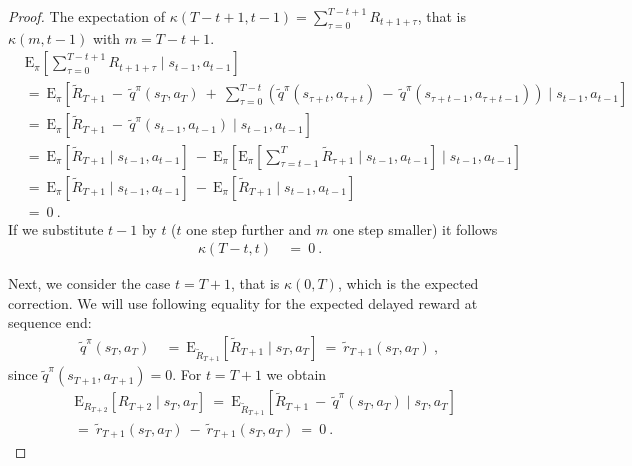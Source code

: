 \documentclass{article}
\newcommand\EXP{\mathbf{\mathrm{E}}}
\begin{document}
\begin{appendices}
\begin{proof}
The expectation of 
$\kappa(T-t+1,t-1)=\sum_{\tau=0}^{T-t+1} R_{t+1+\tau}$, 
that is $\kappa(m,t-1)$ with $m=T-t+1$.
\begin{align}
  &\EXP_{\pi} \left[ \sum_{\tau=0}^{T-t+1} R_{t+1+\tau}  
  \mid s_{t-1},a_{t-1}\right]\\ \nonumber
  &= \
  \EXP_{\pi} \left[\tilde{R}_{T+1} \ - \ 
  \tilde{q}^\pi(s_T,a_T) \ + \ \sum_{\tau=0}^{T-t}
  \left(\tilde{q}^\pi(s_{\tau+t},a_{\tau+t}) \ - \
    \tilde{q}^\pi(s_{\tau+t-1},a_{\tau+t-1}) \right)  \mid
  s_{t-1},a_{t-1}\right] \\ \nonumber
  &= \
  \EXP_{\pi} \left[ \tilde{R}_{T+1}  \ - \
    \tilde{q}^\pi(s_{t-1},a_{t-1})
    \mid s_{t-1},a_{t-1}\right]\\ \nonumber
   &= \ \EXP_{\pi}\left[\tilde{R}_{T+1} \mid 
  s_{t-1},a_{t-1}\right]  \ - \
   \EXP_{\pi}\left[\EXP_{\pi}\left[ \sum_{\tau=t-1}^{T}
       \tilde{R}_{\tau+1} \mid s_{t-1},a_{t-1}\right] 
       \mid s_{t-1},a_{t-1}\right] \\ \nonumber
 &= \ \EXP_{\pi}\left[ \tilde{R}_{T+1} \mid 
  s_{t-1},a_{t-1}\right]   \ - \
   \EXP_{\pi}\left[ \tilde{R}_{T+1}  \mid s_{t-1},a_{t-1}\right] \\ \nonumber
  &= \ 0 \ .
\end{align}
If we substitute $t-1$ by $t$ ($t$ one step further and $m$ one step smaller)
it follows 
\begin{align}
  \kappa(T-t,t) \ &= \  0 \ . 
\end{align} 

Next, we consider the case $t=T+1$, that is $\kappa(0,T)$, 
which is the expected correction.
We will use following equality for the 
expected delayed reward at sequence end:
\begin{align}
 \tilde{q}^\pi(s_T,a_T) \ &= \   
 \EXP_{\tilde{R}_{T+1}} \left[ \tilde{R}_{T+1}  \mid s_T, a_T \right] 
 \ = \ \tilde{r}_{T+1}(s_T,a_T) \ ,
\end{align} 
since  $\tilde{q}^\pi(s_{T+1},a_{T+1})=0$.
For $t=T+1$ we obtain
\begin{align}
  &\EXP_{R_{T+2}} \left[ R_{T+2}  \mid s_T, a_T \right] \ = \ 
  \EXP_{\tilde{R}_{T+1}} \left[ \tilde{R}_{T+1} \ - \  
  \tilde{q}^\pi(s_T,a_T)  \mid s_T, a_T \right] \\ \nonumber
  &= \ \tilde{r}_{T+1}(s_T,a_T) \ - \ 
  \tilde{r}_{T+1}(s_T,a_T)  \ = \  0 \ .
\end{align} 

\end{proof}


\end{appendices}
\end{document}
